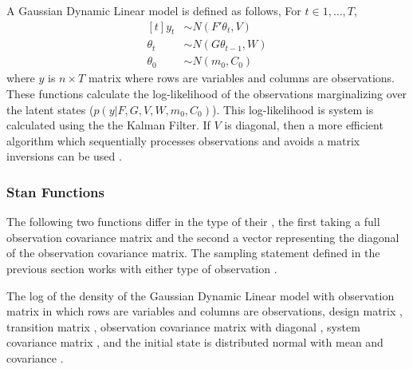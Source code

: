 A Gaussian Dynamic Linear model is defined as follows,
For $t \in 1, \dots, T$,
\[
  \begin{aligned}[t]
    y_{t} &\sim N(F' \theta_{t}, V) \\
    \theta_{t} &\sim N(G \theta_{t - 1}, W) \\
    \theta_{0} &\sim N(m_{0}, C_{0}) 
  \end{aligned}
\]
where $y$ is $n \times T$ matrix where rows are variables and columns
are observations. These functions calculate the log-likelihood of the
observations marginalizing over the latent states ($p(y | F, G, V, W,
m_{0}, C_{0})$).  This log-likelihood is system is calculated using
the the Kalman Filter.  If $V$ is diagonal, then a more efficient
algorithm which sequentially processes observations and avoids a
matrix inversions can be used \citep[Sec~6.4]{DurbinKoopman:2001}.


\subsubsection{Stan Functions}

The following two functions differ in the type of their , the
first taking a full observation covariance matrix  and the
second a vector  representing the diagonal of the observation
covariance matrix.  The sampling statement defined in the previous
section works with either type of observation .

\begin{description}
%
% 
%
 {The log of the density of the Gaussian Dynamic
  Linear model with observation matrix  in which rows are
  variables and columns are observations, design matrix ,
  transition matrix , observation covariance matrix with
  diagonal , system covariance matrix , and the
  initial state is distributed normal with mean  and
  covariance .}
%
\end{description}


